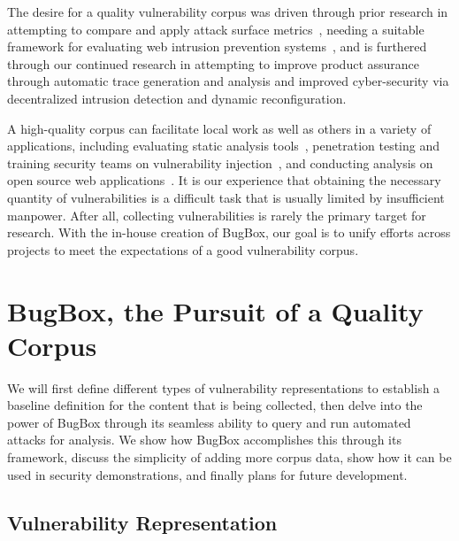 \documentclass[letterpaper,twocolumn,10pt]{article}
\begin{document}
The desire for a quality vulnerability corpus was driven through prior research in attempting to compare and apply attack surface metrics~\cite{Stuckman:2012:CAA:2372225.2372229}, needing a suitable framework for evaluating web intrusion prevention systems~\cite{Stuckman:2011:TEW:2195220.2195671}, and is furthered through our continued research in attempting to improve product assurance through automatic trace generation and analysis and improved cyber-security via decentralized intrusion detection and dynamic reconfiguration.  \par
A high-quality corpus can facilitate local work as well as others in a variety of applications, including evaluating static analysis tools~\cite{Zitser:2004:TSA:1041685.1029911}, penetration testing and training security teams on vulnerability injection~\cite{4725309}, and conducting analysis on open source web applications~\cite{DBLP:journals/ese/HuynhM10}.  It is our experience that obtaining the necessary quantity of vulnerabilities is a difficult task that is usually limited by insufficient manpower. After all, collecting vulnerabilities is rarely the primary target for research. With the in-house creation of BugBox, our goal is to unify efforts across projects to meet the expectations of a good vulnerability corpus. 

\section {BugBox, the Pursuit of a Quality Corpus}

We will first define different types of vulnerability representations to establish a baseline definition for the content that is being collected, then delve into the power of BugBox through its seamless ability to query and run automated attacks for analysis.  We show how BugBox accomplishes this through its framework, discuss the simplicity of adding more corpus data, show how it can be used in security demonstrations, and finally plans for future development.

\subsection{Vulnerability Representation}
\end{document}
